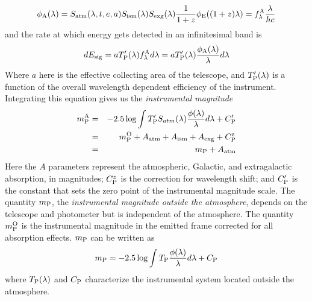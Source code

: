 \documentclass{article}
\newcommand{\bua}{\begin{eqnarray*}}
\newcommand{\eua}{\end{eqnarray*}}
\begin{document}
\[
\phi_{\rm A}(\lambda)=S_{\rm atm}(\lambda,t,e,a)S_{\rm ism}(\lambda) S_{\rm
  exg}(\lambda)\frac{1}{1+z}\phi_{\rm E}((1+z)\lambda)=f^{\rm A}_\lambda\frac{\lambda}{hc}
\]
and the rate at which energy gets detected in an infinitesimal band is 
\[
dE_{\rm sig}=aT'_{\rm P}(\lambda)f^{\rm A}_\lambda d\lambda=aT'_{\rm
  P}(\lambda)\frac{\phi_{\rm A}(\lambda)}{\lambda}d\lambda
\]
Where $a$ here is the effective collecting area of the telescope, and
$T'_{\rm P}(\lambda)$ is a function of the overall wavelength
dependent efficiency of the instrument. Integrating this equation
gives us the {\it instrumental magnitude}
\bua
m^{\rm A}_{\rm P}&=&
-2.5\log\int T'_{\rm
  P}S_{atm}(\lambda)\frac{\phi(\lambda)}{\lambda}d\lambda+C'_{\rm P}
\\
&=&m_{\rm P}^{\rm O}+A_{\rm atm}+A_{\rm ism}+A_{\rm exg}+C^{\rm
  z}_{\rm P} \\
&=&m_{\rm P}+A_{\rm atm}
\eua
Here the $A$ parameters represent the atmospheric, Galactic, and
extragalactic absorption, in magnitudes; $C_{\rm P}^z$ is the
correction for wavelength shift; and $C'_{\rm P}$ is the constant that
sets the zero point of the instrumental magnitude scale. The quantity
$m_{\rm P}$, the {\it instrumental magnitude outside the atmosphere},
depends on the telescope and photometer but is independent of the
atmosphere. The quantity $m_{\rm P}^{\rm O}$ is the instrumental
magnitude in the emitted frame corrected for all absorption
effects. $m_{\rm P}$ can be written as
\[
m_{\rm P}=-2.5\log\int T_{\rm
  P}\frac{\phi(\lambda)}{\lambda}d\lambda+C_{\rm P}
\]
where $T_{\rm P}(\lambda)$ and $C_{\rm P}$ characterize the
instrumental system located outside the atmosphere.
\end{document}
